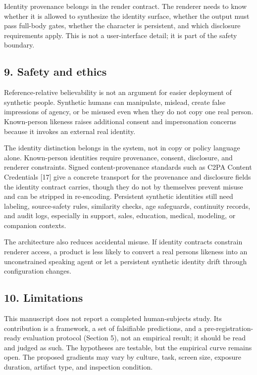 \documentclass[
]{article}
\begin{document}
Identity provenance belongs in the render contract. The renderer needs
to know whether it is allowed to synthesize the identity surface,
whether the output must pass full-body gates, whether the character is
persistent, and which disclosure requirements apply. This is not a
user-interface detail; it is part of the safety boundary.

\subsection{9. Safety and ethics}\label{9-safety-and-ethics}

Reference-relative believability is not an argument for easier
deployment of synthetic people. Synthetic humans can manipulate,
mislead, create false impressions of agency, or be misused even when
they do not copy one real person. Known-person likeness raises
additional consent and impersonation concerns because it invokes an
external real identity.

The identity distinction belongs in the system, not in copy or policy
language alone. Known-person identities require provenance, consent,
disclosure, and renderer constraints. Signed content-provenance
standards such as C2PA Content Credentials {[}17{]} give a concrete
transport for the provenance and disclosure fields the identity contract
carries, though they do not by themselves prevent misuse and can be
stripped in re-encoding. Persistent synthetic identities still need
labeling, source-safety rules, similarity checks, age safeguards,
continuity records, and audit logs, especially in support, sales,
education, medical, modeling, or companion contexts.

The architecture also reduces accidental misuse. If identity contracts
constrain renderer access, a product is less likely to convert a real
person\textquotesingle s likeness into an unconstrained speaking agent
or let a persistent synthetic identity drift through configuration
changes.

\subsection{10. Limitations}\label{10-limitations}

This manuscript does not report a completed human-subjects study. Its
contribution is a framework, a set of falsifiable predictions, and a
pre-registration-ready evaluation protocol (Section 5), not an empirical
result; it should be read and judged as such. The hypotheses are
testable, but the empirical curve remains open. The proposed gradients
may vary by culture, task, screen size, exposure duration, artifact
type, and inspection condition.
\end{document}
